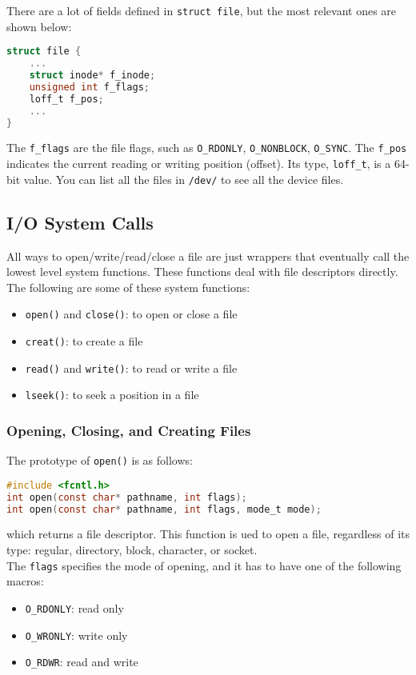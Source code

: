 \documentclass{article}
\renewcommand{\b}{\item[$\circ$]}
\newcommand{\newlist}{\begin{itemize}}
\renewcommand{\endlist}{\end{itemize}}
\newcommand{\code}[1]{\texttt{#1}}
\begin{document}
\noindent There are a lot of fields defined in \code{struct file}, but the most relevant ones are shown below: 

\begin{lstlisting}[language=C]
struct file {
    ...
    struct inode* f_inode;
    unsigned int f_flags;
    loff_t f_pos;
    ...
}
\end{lstlisting}

\noindent The \code{f\_flags} are the file flags, such as \code{O\_RDONLY}, \code{O\_NONBLOCK}, \code{O\_SYNC}. The \code{f\_pos} indicates the current reading or writing position (offset). Its type, \code{loff\_t}, is a 64-bit value. You can list all the files in \code{/dev/} to see all the device files. 

\subsection{I/O System Calls}

All ways to open/write/read/close a file are just wrappers that eventually call the lowest level system functions. These functions deal with file descriptors directly. The following are some of these system functions:

\newlist
\b \code{open()} and \code{close()}: to open or close a file
\b \code{creat()}: to create a file 
\b \code{read()} and \code{write()}: to read or write a file
\b \code{lseek()}: to seek a position in a file
\endlist

\subsubsection{Opening, Closing, and Creating Files}

The prototype of \code{open()} is as follows:

\begin{lstlisting}[language=C]
#include <fcntl.h>
int open(const char* pathname, int flags);
int open(const char* pathname, int flags, mode_t mode);
\end{lstlisting}

\noindent which returns a file descriptor. This function is ued to open a file, regardless of its type: regular, directory, block, character, or socket. \\

\noindent The \code{flags} specifies the mode of opening, and it has to have one of the following macros:

\newlist
\b \code{O\_RDONLY}: read only
\b \code{O\_WRONLY}: write only
\b \code{O\_RDWR}: read and write
\endlist
\end{document}

